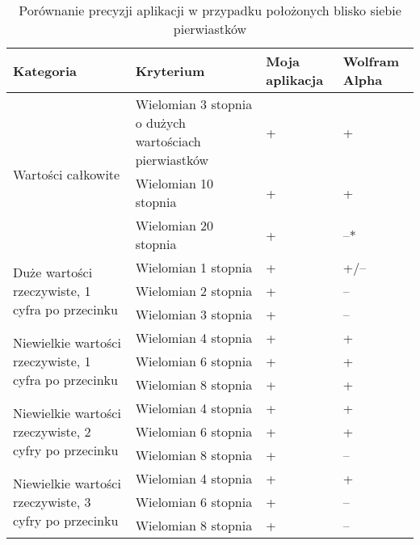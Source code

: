 \begin{table}
	\caption{Porównanie precyzji aplikacji w przypadku położonych blisko siebie pierwiastków}
	\begin{tabular}{ |p{5cm}|p{5cm}|p{1.5cm}|p{1.5cm}| } 
		\hline
		Kategoria & Kryterium & Moja aplikacja & Wolfram Alpha \\
		\hline
		\multirow{3}{*}{Wartości całkowite}
		& Wielomian 3 stopnia o dużych wartościach pierwiastków & + & + \\
		& Wielomian 10 stopnia & + & + \\
		& Wielomian 20 stopnia & + & --* \\
		\hline
		\multirow{3}{12em}{Duże wartości rzeczywiste, 1 cyfra po przecinku}
		& Wielomian 1 stopnia & + & +/-- \\
		& Wielomian 2 stopnia & + & -- \\
		& Wielomian 3 stopnia & + & -- \\
		\hline
		\multirow{3}{14em}{Niewielkie wartości rzeczywiste, 1 cyfra po przecinku}
		& Wielomian 4 stopnia & + & + \\
		& Wielomian 6 stopnia & + & + \\
		& Wielomian 8 stopnia & + & + \\
		\hline
		\multirow{3}{14em}{Niewielkie wartości rzeczywiste, 2 cyfry po przecinku}
		& Wielomian 4 stopnia & + & + \\
		& Wielomian 6 stopnia & + & + \\
		& Wielomian 8 stopnia & + & -- \\
		\hline
		\multirow{3}{14em}{Niewielkie wartości rzeczywiste, 3 cyfry po przecinku}
		& Wielomian 4 stopnia & + & + \\
		& Wielomian 6 stopnia & + & -- \\
		& Wielomian 8 stopnia & + & -- \\
		\hline
	\end{tabular}
\end{table}
